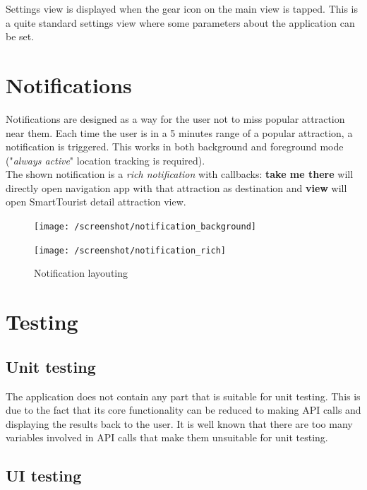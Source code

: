 \documentclass[a4paper, 11pt, parskip=half]{scrreprt}
\theoremstyle{definition}
\begin{document}
Settings view is displayed when the gear icon on the main view is tapped. This is a quite standard settings view where some parameters about the application can be set.




\chapter{Notifications}

Notifications are designed as a way for the user not to miss popular attraction near them. Each time the user is in a 5 minutes range of a popular attraction, a notification is triggered. This works in both background and foreground mode ("\textit{always active}" location tracking is required).
\\The shown notification is a \textit{rich notification} with callbacks: \textbf{take me there} will directly open navigation app with that attraction as destination and \textbf{view} will open SmartTourist detail attraction view.

\begin{figure}[H]
	\centering
	\begin{minipage}{.5\textwidth}
  	\centering
  	\texttt{[image: /screenshot/notification\_background]}
  	\label{fig:test1}
	\end{minipage}%
	\begin{minipage}{.5\textwidth}
  	\centering
  	\texttt{[image: /screenshot/notification\_rich]}
  	\label{fig:test2}
	\end{minipage}
	\caption{Notification layouting}
\end{figure}




\chapter{Testing}

\section{Unit testing}

The application does not contain any part that is suitable for unit testing. This is due to the fact that its core functionality can be reduced to making API calls and displaying the results back to the user. It is well known that there are too many variables involved in API calls that make them unsuitable for unit testing.

\section{UI testing}
\end{document}
